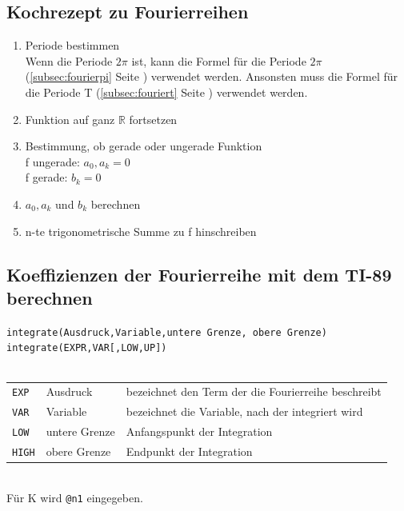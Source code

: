 \subsection{Kochrezept zu Fourierreihen}
\begin{enumerate}
  \item Periode bestimmen\\
  Wenn die Periode $2\pi$ ist, kann die Formel für die Periode $2\pi$ 
  (\ref{subsec:fourierpi} Seite \pageref{subsec:fourierpi}) verwendet werden. 
  Ansonsten muss die Formel für die Periode T (\ref{subsec:fouriert} Seite 
  \pageref{subsec:fouriert}) verwendet werden. 
  \item Funktion auf ganz $\mathbb{R}$ fortsetzen
  \item Bestimmung, ob gerade oder ungerade Funktion\\
  f ungerade: $a_0, a_k = 0$\\
  f gerade: $b_k = 0$
  \item $a_0, a_k$ und $b_k$ berechnen
  \item n-te trigonometrische Summe zu f hinschreiben
\end{enumerate}

\ifti
\subsection{Koeffizienzen der Fourierreihe mit dem TI-89 berechnen}
\verb?integrate(Ausdruck,Variable,untere Grenze, obere Grenze)? \\
\verb?integrate(EXPR,VAR[,LOW,UP])? \\\\
\begin{tabular}{@{}lll}
\verb?EXP?  & Ausdruck      & bezeichnet den Term der die Fourierreihe 
beschreibt \\
\verb?VAR?  & Variable      & bezeichnet die Variable, nach der integriert 
wird \\
\verb?LOW?  & untere Grenze & Anfangspunkt der Integration \\
\verb?HIGH? & obere Grenze  & Endpunkt der Integration \\
\end{tabular}\\
Für K wird \verb?@n1? eingegeben. 
\fi
\ifnspire

